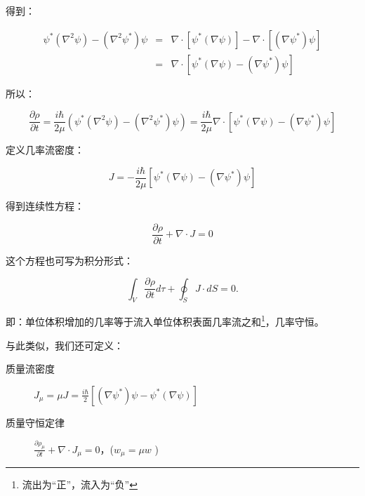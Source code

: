 得到：

\begin{eqnarray*}
\psi ^* \left( {\nabla ^2 \psi } \right) - \left( {\nabla ^2 \psi ^* } \right)\psi  & = & \nabla  \cdot \left[ {\psi ^* \left( {\nabla \psi } \right)} \right] - \nabla  \cdot \left[ {\left( {\nabla \psi ^* } \right)\psi } \right]   \\
{} &  =  &  \nabla  \cdot \left[ {\psi ^* \left( {\nabla \psi } \right) - \left( {\nabla \psi ^* } \right)\psi } \right]
\end{eqnarray*}

所以：

\begin{equation*}
\frac{{\partial \rho}}{{\partial t}} = \frac{{i\hbar }}{{2\mu
}}\left( {\psi ^* \left( {\nabla ^2 \psi } \right) - \left( {\nabla
^2 \psi ^* } \right)\psi } \right) = \frac{{i\hbar }}{{2\mu }}\nabla
\cdot \left[ {\psi ^* \left( {\nabla \psi } \right) - \left( {\nabla
\psi ^* } \right)\psi } \right]
\end{equation*}

定义几率流密度：

\begin{equation}
J =  - \frac{{i\hbar }}{{2\mu }}\left[ {\psi ^* \left( {\nabla \psi } \right) - \left( {\nabla \psi ^* } \right)\psi } \right]
\end{equation}


得到连续性方程：

\begin{equation}\label{continue eq}
    \frac{{\partial \rho}}{{\partial t}} + \nabla  \cdot J = 0
\end{equation}


这个方程也可写为积分形式：

\begin{equation}
\int_V {\frac{{\partial \rho}}{{\partial t}}d\tau  + \oint_S {J \cdot dS} }  = 0.
\end{equation}

即：单位体积增加的几率等于流入单位体积表面几率流之和\footnote{流出为``正''，流入为``负''}，几率守恒。

与此类似，我们还可定义：


\begin{description}
    \item[质量流密度] $J_\mu   = \mu J = \frac{{i\hbar }}{2}\left[ {\left( {\nabla \psi ^* } \right)\psi  - \psi ^* \left( {\nabla \psi } \right)} \right]$
    \item[质量守恒定律] $\frac{{\partial \rho_\mu  }}{{\partial t}} + \nabla  \cdot J_\mu   = 0$，($w_\mu   = \mu w$
)
   \end{description}

